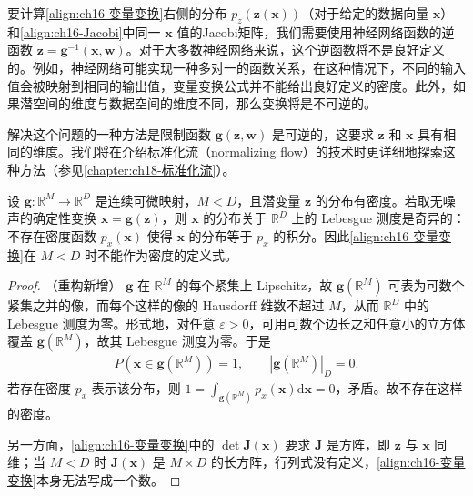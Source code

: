 \documentclass[../../main.tex]{subfiles}
\begin{document}
要计算\eqref{align:ch16-变量变换}右侧的分布 $p_z(\bm{z}(\bm{x}))$（对于给定的数据向量 $\bm{x}$）和\eqref{align:ch16-Jacobi}中同一 $\bm{x}$ 值的Jacobi矩阵，我们需要使用神经网络函数的逆函数 $\bm{z}=\bm{g}^{-1}(\bm{x},\bm{w})$。对于大多数神经网络来说，这个逆函数将不是良好定义的。例如，神经网络可能实现一种多对一的函数关系，在这种情况下，不同的输入值会被映射到相同的输出值，变量变换公式并不能给出良好定义的密度。此外，如果潜空间的维度与数据空间的维度不同，那么变换将是不可逆的。

解决这个问题的一种方法是限制函数 $\bm{g}(\bm{z},\bm{w})$ 是可逆的，这要求 $\bm{z}$ 和 $\bm{x}$ 具有相同的维度。我们将在介绍标准化流（normalizing flow）的技术时更详细地探索这种方法（参见\cref{chapter:ch18-标准化流}）。

\begin{proposition}[流形上的分布是奇异的]\label{proposition:ch16-流形奇异}
设 $\bm{g}:\mathbb{R}^{M}\rightarrow\mathbb{R}^{D}$ 是连续可微映射，$M<D$，且潜变量 $\bm{z}$ 的分布有密度。若取无噪声的确定性变换 $\bm{x}=\bm{g}(\bm{z})$，则 $\bm{x}$ 的分布关于 $\mathbb{R}^{D}$ 上的 Lebesgue 测度是奇异的：不存在密度函数 $p_x(\bm{x})$ 使得 $\bm{x}$ 的分布等于 $p_x$ 的积分。因此\eqref{align:ch16-变量变换}在 $M<D$ 时不能作为密度的定义式。
\end{proposition}

\begin{proof}（重构新增）
$\bm{g}$ 在 $\mathbb{R}^{M}$ 的每个紧集上 Lipschitz，故 $\bm{g}(\mathbb{R}^{M})$ 可表为可数个紧集之并的像，而每个这样的像的 Hausdorff 维数不超过 $M$，从而 $\mathbb{R}^{D}$ 中的 Lebesgue 测度为零。形式地，对任意 $\varepsilon>0$，可用可数个边长之和任意小的立方体覆盖 $\bm{g}(\mathbb{R}^{M})$，故其 Lebesgue 测度为零。于是
\begin{align*}
  P\left(\bm{x}\in\bm{g}(\mathbb{R}^{M})\right)=1,\qquad \left|\bm{g}(\mathbb{R}^{M})\right|_{D}=0 .
\end{align*}
若存在密度 $p_x$ 表示该分布，则 $1=\int_{\bm{g}(\mathbb{R}^{M})}p_x(\bm{x})\mathrm{d}\bm{x}=0$，矛盾。故不存在这样的密度。

另一方面，\eqref{align:ch16-变量变换}中的 $\det\bm{J}(\bm{x})$ 要求 $\bm{J}$ 是方阵，即 $\bm{z}$ 与 $\bm{x}$ 同维；当 $M<D$ 时 $\bm{J}(\bm{x})$ 是 $M\times D$ 的长方阵，行列式没有定义，\eqref{align:ch16-变量变换}本身无法写成一个数。
\end{proof}
\end{document}
